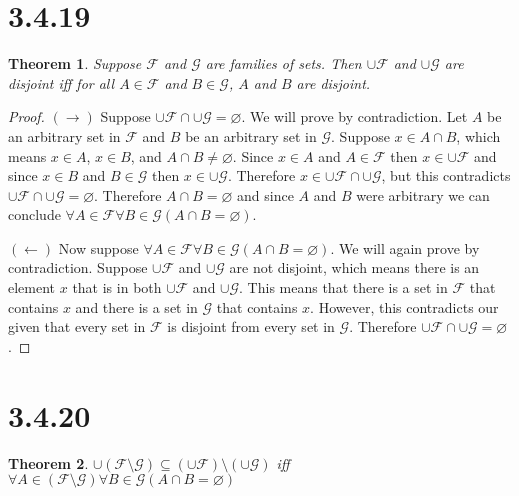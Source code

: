 \documentclass{article}
\newcommand{\F}{\mathcal{F}}
\newcommand{\G}{\mathcal{G}}
\newtheorem*{theorem}{Theorem}  %
\begin{document}
\section*{3.4.19}

\begin{theorem} Suppose $\F$ and $\G$ are families of sets. Then $\cup \F$ and $\cup \G$ are disjoint iff for all $A \in \F$ and $B \in \G$, $A$ and $B$ are disjoint.
\end{theorem}

\begin{proof}
$(\rightarrow)$ Suppose $\cup \F \cap \cup \G = \varnothing$. We will prove by contradiction. Let $A$ be an arbitrary set in $\F$ and $B$ be an arbitrary set in $\G$. Suppose $x \in A \cap B$, which means $x \in A$, $x \in B$, and $A \cap B \neq \varnothing$. Since $x \in A$ and $A \in \F$ then $x \in \cup \F$ and since $x \in B$ and $B \in \G$ then $x \in \cup \G$. Therefore $x \in \cup \F \cap \cup \G$, but this contradicts $\cup \F \cap \cup \G = \varnothing$. Therefore $A \cap B = \varnothing$ and since $A$ and $B$ were arbitrary we can conclude $\forall A \in \F \forall B \in \G (A \cap B = \varnothing)$.

$(\leftarrow)$ Now suppose $\forall A \in \F \forall B \in \G (A \cap B = \varnothing)$. We will again prove by contradiction. Suppose $\cup \F$ and $\cup \G$ are not disjoint, which means there is an element $x$ that is in both $\cup \F$ and $\cup \G$. This means that there is a set in $\F$ that contains $x$ and there is a set in $\G$ that contains $x$. However, this contradicts our given that every set in $\F$ is disjoint from every set in $\G$. Therefore $\cup \F \cap \cup \G = \varnothing$.
\end{proof}

\section*{3.4.20}
\begin{theorem} $\cup ( \F \setminus \G) \subseteq (\cup \F) \setminus (\cup \G)$ iff $ \forall A \in (\F \setminus \G) \forall B \in \G(A \cap B = \varnothing)$
\end{theorem}
\end{document}
